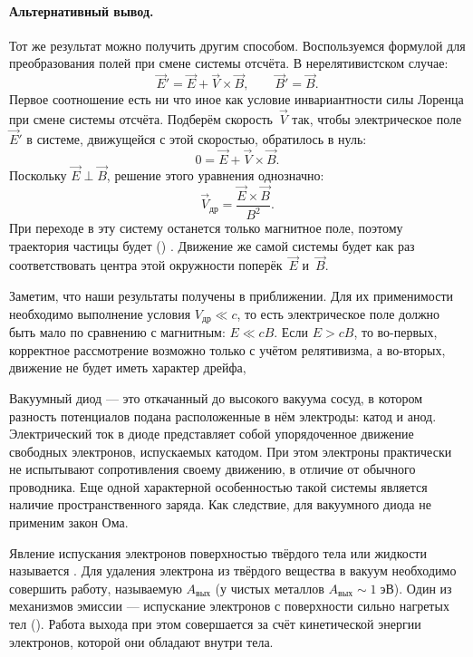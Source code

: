 
\paragraph{Альтернативный вывод.}
Тот же результат можно получить другим способом. Воспользуемся
формулой для преобразования полей при смене системы отсчёта. В нерелятивистском
случае:
\[
\vec{E}' = \vec{E} + \vec{V}\times \vec{B},\qquad \vec{B}'=\vec{B}.
\]
Первое соотношение есть ни что иное как условие инвариантности силы
Лоренца при смене системы отсчёта. Подберём скорость~$\vec{V}$ так, чтобы
электрическое поле $\vec{E}'$ в системе, движущейся с этой скоростью, обратилось
в нуль:
\[
 0 = \vec{E} + \vec{V}\times \vec{B}.
\]
Поскольку $\vec{E}\perp \vec{B}$, решение этого уравнения однозначно:
\begin{equation}
    \vec{V}_{др} = \frac{\vec{E}\times \vec{B}}{B^2}.
\end{equation}
При переходе в эту систему останется только магнитное поле, поэтому
траектория частицы будет  ()
. Движение же самой системы будет как раз соответствовать
 центра этой окружности поперёк~$\vec{E}$ и~$\vec{B}$.

\begin{lab:note}
Заметим, что наши результаты получены в 
приближении. Для их применимости необходимо выполнение условия $V_{др}\ll c$,
то есть электрическое поле должно быть мало по сравнению с магнитным: $E\ll cB$.
Если $E>cB$, то во-первых, корректное рассмотрение возможно только с учётом
релятивизма, а во-вторых, движение не будет иметь характер дрейфа,
\end{lab:note}



Вакуумный диод --- это откачанный до высокого вакуума сосуд,
в котором разность потенциалов подана расположенные в нём электроды:
катод и анод. Электрический ток в диоде представляет собой упорядоченное
движение
свободных электронов, испускаемых катодом.  При этом электроны практически не
испытывают сопротивления своему движению, в отличие от обычного проводника.
Еще одной характерной особенностью такой системы является наличие
пространственного заряда. Как следствие, для вакуумного диода не применим закон
Ома.

Явление испускания электронов поверхностью твёрдого тела или жидкости называется
. Для удаления электрона из твёрдого вещества в
вакуум необходимо совершить работу, называемую  $A_{вых}$
(у чистых металлов $A_{вых}\sim 1\;эВ$).
Один из механизмов эмиссии --- испускание электронов с поверхности сильно
нагретых тел (). Работа выхода при этом
совершается за счёт кинетической энергии электронов, которой они обладают
внутри тела.

